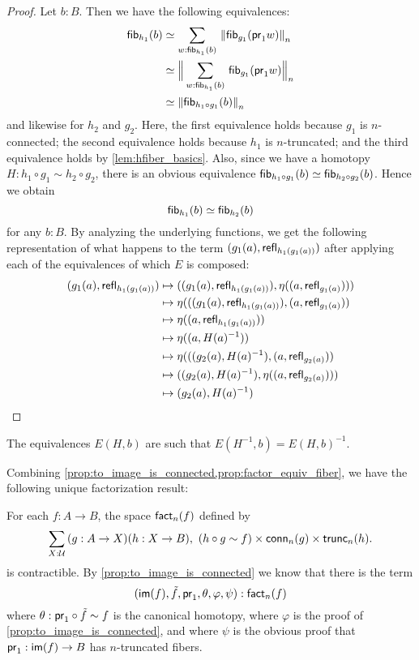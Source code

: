 \begin{proof}
Let $b:B$. Then we have the following equivalences:
\begin{align*}
\hfib{h_1}b & \simeq \sm{w:\hfib{h_1}b} \trunc n{ \hfib{g_1}{\proj1 w}}\\
& \simeq \Trunc n{\sm{w:\hfib{h_1}b}\hfib{g_1}{\proj1 w}}\\
& \simeq \trunc n{\hfib{h_1\circ g_1}b}
\end{align*}
and likewise for $h_2$ and $g_2$. Here, the first equivalence holds because $g_1$ is $n$-connected; the second equivalence
holds because $h_1$ is $n$-truncated; and the third equivalence holds by \autoref{lem:hfiber_basics}. Also, since we have a
homotopy $H:h_1\circ g_1\sim h_2\circ g_2$, there is an obvious equivalence ${\mathsf{fib}}_{h_1\circ g_1}(b)\simeq{\mathsf{fib}}_{h_2\circ g_2}(b)$. Hence we
obtain
\begin{equation*}
{\mathsf{fib}}_{h_1}(b)\simeq{\mathsf{fib}}_{h_2}(b)
\end{equation*}
for any $b:B$. By analyzing the underlying functions, we get the following representation of what happens to the term
${(g_1(a),\mathsf{refl}_{h_1(g_1(a))})}$ after applying each of the equivalences of which $E$ is composed:
\begin{align*}
{(g_1(a),\ensuremath{\mathsf{refl}_{h_1(g_1(a))}})} & 
    \mapsto {({(g_1(a),\ensuremath{\mathsf{refl}_{h_1(g_1(a))}})}, \eta( {(a,\ensuremath{\mathsf{refl}_{g_1(a)}})} ))}\\
  & \mapsto \eta( {({(g_1(a),\mathsf{refl}_{h_1(g_1(a))})}, {(a,\mathsf{refl}_{g_1(a)})} )}\\
  & \mapsto \eta( {(a,\mathsf{refl}_{h_1(g_1(a))})})\\
  & \mapsto \eta( {(a,H(a)^{-1})})\\
  & \mapsto \eta( {({(g_2(a),H(a)^{-1})},{(a,\mathsf{refl}_{g_2(a)})})}\\
  & \mapsto {({(g_2(a),H(a)^{-1})}, \eta({(a,\ensuremath{\mathsf{refl}_{g_2(a)}})}) )}\\
  & \mapsto {(g_2(a),H(a)^{-1})}\qedhere
\end{align*}
\end{proof}

The equivalences $E(H,b)$ are such that $E(H^{-1},b)= E(H,b)^{-1}$.

Combining \autoref{prop:to_image_is_connected,prop:factor_equiv_fiber}, we have the following unique factorization result:

\begin{thm}
For each $f:A\to B$, the space $\textsf{fact}_n(f)$ defined by
\begin{equation*}
\sm{X:\type}(g:A\to X)(h:X\to B),\ (h\circ g\sim f)\times\mathsf{conn}_n(g)\times\mathsf{trunc}_n(h).
\end{equation*}
is contractible. By \autoref{prop:to_image_is_connected} we know that there is the term
\begin{equation*}
{(\ensuremath{\mathsf{im}}(f),\tilde{f},\ensuremath{\mathsf{pr}_{1}},\theta,\varphi,\psi)}:\textsf{fact}_n(f)
\end{equation*}
where $\theta:\mathsf{pr}_{1}\circ\tilde{f}\sim f$ is the canonical homotopy, where $\varphi$ is the proof of
\autoref{prop:to_image_is_connected}, and where $\psi$ is the obvious proof that $\mathsf{pr}_{1}:\mathsf{im}(f)\to B$ has $n$-truncated fibers.
\end{thm}

